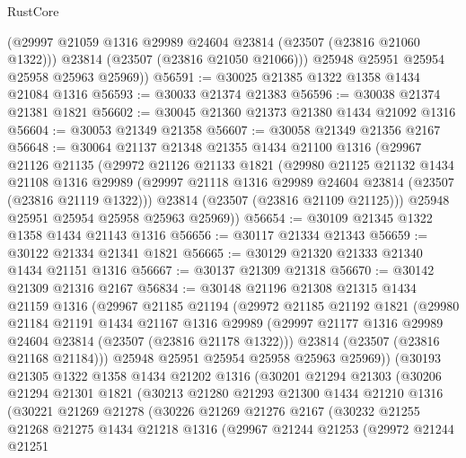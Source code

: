\begin{lexlean}{RustCore}
\begin{coremodule}
          (@29997 @21059 @1316 @29989 @24604 @23814 (@23507 (@23816 @21060 @1322)))
          @23814
          (@23507 (@23816 @21050 @21066)))
        @25948
        @25951
        @25954
        @25958
        @25963
        @25969))
@56591 := @30025 @21385 @1322 @1358 @1434 @21084 @1316
@56593 := @30033 @21374 @21383
@56596 := @30038 @21374 @21381 @1821
@56602 := @30045 @21360 @21373 @21380 @1434 @21092 @1316
@56604 := @30053 @21349 @21358
@56607 := @30058 @21349 @21356 @2167
@56648 := @30064
    @21137
    @21348
    @21355
    @1434
    @21100
    @1316
    (@29967
      @21126
      @21135
      (@29972
        @21126
        @21133
        @1821
        (@29980
          @21125
          @21132
          @1434
          @21108
          @1316
          @29989
          (@29997 @21118 @1316 @29989 @24604 @23814 (@23507 (@23816 @21119 @1322)))
          @23814
          (@23507 (@23816 @21109 @21125)))
        @25948
        @25951
        @25954
        @25958
        @25963
        @25969))
@56654 := @30109 @21345 @1322 @1358 @1434 @21143 @1316
@56656 := @30117 @21334 @21343
@56659 := @30122 @21334 @21341 @1821
@56665 := @30129 @21320 @21333 @21340 @1434 @21151 @1316
@56667 := @30137 @21309 @21318
@56670 := @30142 @21309 @21316 @2167
@56834 := @30148
    @21196
    @21308
    @21315
    @1434
    @21159
    @1316
    (@29967
      @21185
      @21194
      (@29972
        @21185
        @21192
        @1821
        (@29980
          @21184
          @21191
          @1434
          @21167
          @1316
          @29989
          (@29997 @21177 @1316 @29989 @24604 @23814 (@23507 (@23816 @21178 @1322)))
          @23814
          (@23507 (@23816 @21168 @21184)))
        @25948
        @25951
        @25954
        @25958
        @25963
        @25969))
    (@30193
      @21305
      @1322
      @1358
      @1434
      @21202
      @1316
      (@30201
        @21294
        @21303
        (@30206
          @21294
          @21301
          @1821
          (@30213
            @21280
            @21293
            @21300
            @1434
            @21210
            @1316
            (@30221
              @21269
              @21278
              (@30226
                @21269
                @21276
                @2167
                (@30232
                  @21255
                  @21268
                  @21275
                  @1434
                  @21218
                  @1316
                  (@29967
                    @21244
                    @21253
                    (@29972
                      @21244
                      @21251

\end{coremodule}
\end{lexlean}
